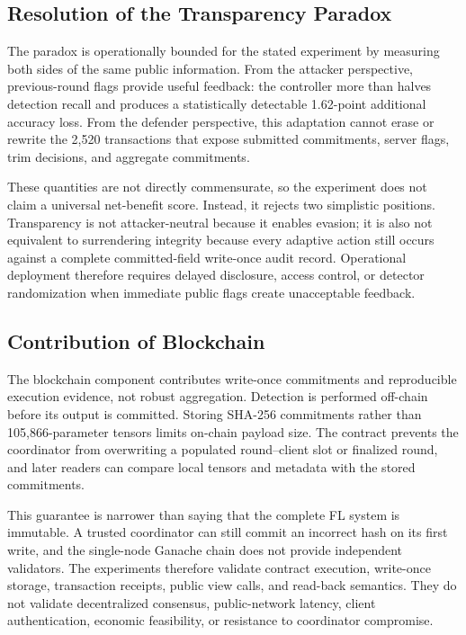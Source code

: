 \documentclass[10pt,letterpaper]{article}
\begin{document}
\subsection{Resolution of the Transparency Paradox}

The paradox is operationally bounded for the stated experiment by measuring both
sides of the same public information. From the attacker perspective,
previous-round flags provide useful feedback: the controller more than halves
detection recall and produces a statistically detectable 1.62-point additional
accuracy loss. From the defender perspective, this adaptation cannot erase or
rewrite the 2,520 transactions that expose submitted commitments, server flags,
trim decisions, and aggregate commitments.

These quantities are not directly commensurate, so the experiment does not
claim a universal net-benefit score. Instead, it rejects two simplistic
positions. Transparency is not attacker-neutral because it enables evasion; it
is also not equivalent to surrendering integrity because every adaptive action
still occurs against a complete committed-field write-once audit record.
Operational deployment therefore requires delayed disclosure, access control, or
detector randomization when immediate public flags create unacceptable feedback.

\subsection{Contribution of Blockchain}

The blockchain component contributes write-once commitments and reproducible
execution evidence, not robust aggregation. Detection is performed off-chain
before its output is committed. Storing SHA-256 commitments rather than
105,866-parameter tensors limits on-chain payload size. The contract prevents
the coordinator from overwriting a populated round--client slot or finalized
round, and later readers can compare local tensors and metadata with the stored
commitments.

This guarantee is narrower than saying that the complete FL system is
immutable. A trusted coordinator can still commit an incorrect hash on its
first write, and the single-node Ganache chain does not provide independent
validators. The experiments therefore validate contract execution, write-once
storage, transaction receipts, public view calls, and read-back semantics. They
do not validate
decentralized consensus, public-network latency, client authentication,
economic feasibility, or resistance to coordinator compromise.
\end{document}
